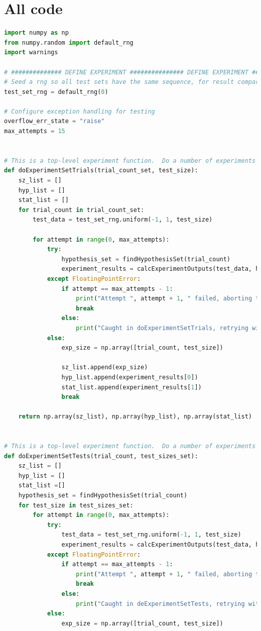 \documentclass[12pt]{article}
\begin{document}
\section*{All code}
\lstset{style=mystyle_top}
\begin{lstlisting}[language=Python, caption=experiement\_funcs.py]
import numpy as np
from numpy.random import default_rng
import warnings

# ############## DEFINE EXPERIMENT ############### DEFINE EXPERIMENT ############### DEFINE EXPERIMENT ############## #
# Seed a rng so all test sets have the same sequence, for result comparability.
test_set_rng = default_rng(0)

# Configure exception handling for testing
overflow_err_state = "raise"
max_attempts = 15


# This is a top-level experiment function.  Do a number of experiments of varying trial counts
def doExperimentSetTrials(trial_count_set, test_size):
    sz_list = []
    hyp_list = []
    stat_list = []
    for trial_count in trial_count_set:
        test_data = test_set_rng.uniform(-1, 1, test_size)

        for attempt in range(0, max_attempts):
            try:
                hypothesis_set = findHypothesisSet(trial_count)
                experiment_results = calcExperimentOutputs(test_data, hypothesis_set)
            except FloatingPointError:
                if attempt == max_attempts - 1:
                    print("Attempt ", attempt + 1, " failed, aborting trial count: ", trial_count)
                    break
                else:
                    print("Caught in doExperimentSetTrials, retrying with attempt:", attempt + 2, " of ", max_attempts)
            else:
                exp_size = np.array([trial_count, test_size])

                sz_list.append(exp_size)
                hyp_list.append(experiment_results[0])
                stat_list.append(experiment_results[1])
                break

    return np.array(sz_list), np.array(hyp_list), np.array(stat_list)


# This is a top-level experiment function.  Do a number of experiments of varying test data sizes
def doExperimentSetTests(trial_count, test_sizes_set):
    sz_list = []
    hyp_list = []
    stat_list =[]
    hypothesis_set = findHypothesisSet(trial_count)
    for test_size in test_sizes_set:
        for attempt in range(0, max_attempts):
            try:
                test_data = test_set_rng.uniform(-1, 1, test_size)
                experiment_results = calcExperimentOutputs(test_data, hypothesis_set)
            except FloatingPointError:
                if attempt == max_attempts - 1:
                    print("Attempt ", attempt + 1, " failed, aborting test size: ", test_size)
                    break
                else:
                    print("Caught in deExperimentSetTests, retrying with attempt:", attempt + 2, " of ", max_attempts)
            else:
                exp_size = np.array([trial_count, test_size])


\end{lstlisting}
\end{document}

